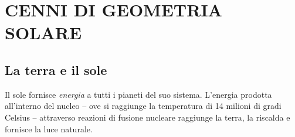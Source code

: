 
\chapter{CENNI DI GEOMETRIA SOLARE}
\label{chp:geometria-solare}

\section{La terra e il sole}
\label{sec:terra-sole}

Il sole fornisce \emph{energia} a tutti i pianeti del suo sistema. L'energia prodotta all'interno del nucleo – ove si raggiunge la temperatura di 14 milioni di gradi Celsius – attraverso reazioni di fusione nucleare raggiunge la terra, la riscalda e fornisce la luce naturale. 

